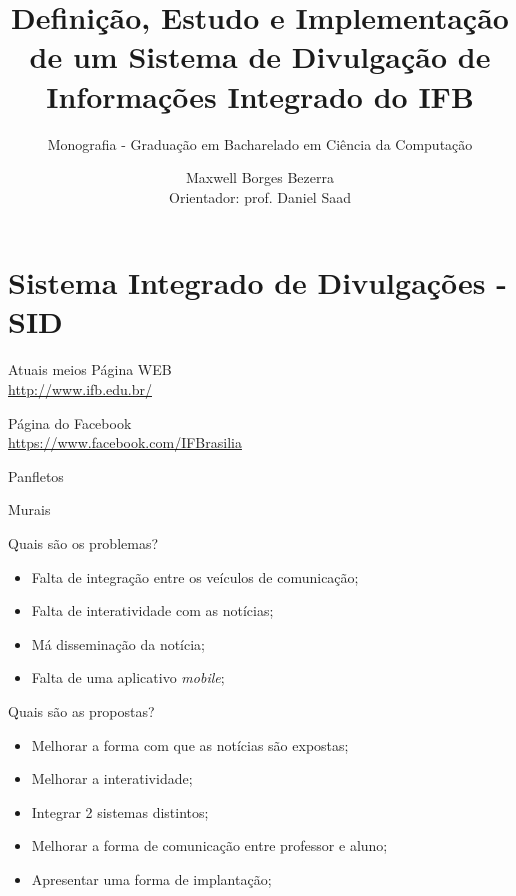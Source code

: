 \documentclass{aula-ifb}
\author{Maxwell Borges Bezerra\\ 
\small{Orientador: prof. Daniel Saad}}
\title{Definição, Estudo e Implementação de um Sistema de Divulgação de Informações Integrado do IFB}
\subtitle{Monografia - Graduação em Bacharelado em Ciência da Computação}
\institute{Instituto Federal de Brasília, Câmpus Taguatinga}
\date{}
\begin{document}
\maketitle

\section{Sistema Integrado de Divulgações - SID}

\begin{frame}{Atuais meios}
\center
Página WEB\\
\url{http://www.ifb.edu.br/}
 
\vspace{20px}

 
Página do Facebook\\
\url{https://www.facebook.com/IFBrasilia}

\vspace{20px}

Panfletos

\vspace{20px}

Murais
\end{frame}

\begin{frame}{Quais são os problemas?}
\begin{itemize}
   \item Falta de integração entre os veículos de comunicação;
   \vspace{10px}
   \item Falta de interatividade com as notícias;
   \vspace{10px}
   \item Má disseminação da notícia;
   \vspace{10px}
   \item{Falta de uma aplicativo \textit{mobile}};
\end{itemize}	 
\end{frame}

\begin{frame}{Quais são as propostas?}
\begin{itemize}
   \item Melhorar a forma com que as notícias são expostas;
   \vspace{10px	}
   \item Melhorar a interatividade;
   \vspace{10px}
   \item Integrar 2 sistemas distintos;
   \vspace{10px}
   \item Melhorar a forma de comunicação entre professor e aluno;
   \vspace{10px}
   \item Apresentar uma forma de implantação;
\end{itemize}
\end{frame}
\end{document}

